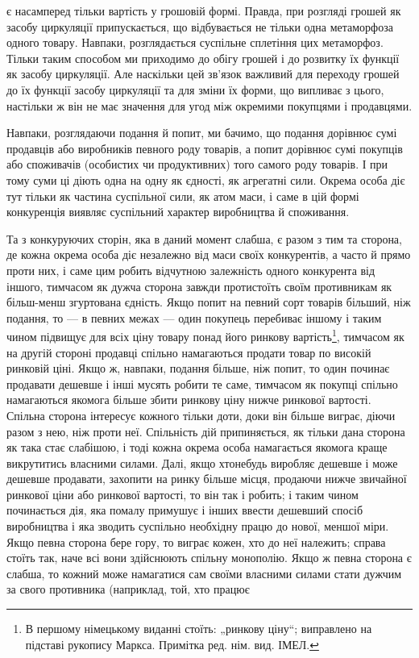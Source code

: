 є насамперед тільки вартість у грошовій формі. Правда, при
розгляді грошей як засобу циркуляції припускається, що відбувається
не тільки одна метаморфоза одного товару. Навпаки,
розглядається суспільне сплетіння цих метаморфоз. Тільки
таким способом ми приходимо до обігу грошей і до розвитку їх
функції як засобу циркуляції. Але наскільки цей зв’язок важливий
для переходу грошей до їх функції засобу циркуляції та
для зміни їх форми, що випливає з цього, настільки ж він не
має значення для угод між окремими покупцями і продавцями.

Навпаки, розглядаючи подання й попит, ми бачимо, що подання
дорівнює сумі продавців або виробників певного роду
товарів, а попит дорівнює сумі покупців або споживачів (особистих
чи продуктивних) того самого роду товарів. І при тому
суми ці діють одна на одну як єдності, як агрегатні сили. Окрема
особа діє тут тільки як частина суспільної сили, як атом маси,
і саме в цій формі конкуренція виявляє суспільний характер
виробництва й споживання.

Та з конкуруючих сторін, яка в даний момент слабша, є разом
з тим та сторона, де кожна окрема особа діє незалежно від маси
своїх конкурентів, а часто й прямо проти них, і саме цим робить
відчутною залежність одного конкурента від іншого, тимчасом
як дужча сторона завжди протистоїть своїм противникам як
більш-менш згуртована єдність. Якщо попит на певний сорт
товарів більший, ніж подання, то — в певних межах — один покупець
перебиває іншому і таким чином підвищує для всіх ціну
товару понад його ринкову вартість\footnote*{
В першому німецькому виданні стоїть: „ринкову ціну“; виправлено на
підставі рукопису Маркса. Примітка ред. нім. вид. ІМЕЛ.
}, тимчасом як на другій
стороні продавці спільно намагаються продати товар по високій
ринковій ціні. Якщо ж, навпаки, подання більше, ніж попит,
то один починає продавати дешевше і інші мусять робити те саме,
тимчасом як покупці спільно намагаються якомога більше збити
ринкову ціну нижче ринкової вартості. Спільна сторона інтересує
кожного тільки доти, доки він більше виграє, діючи разом з нею,
ніж проти неї. Спільність дій припиняється, як тільки дана сторона
як така стає слабішою, і тоді кожна окрема особа намагається
якомога краще викрутитись власними силами. Далі,
якщо хтонебудь виробляє дешевше і може дешевше продавати,
захопити на ринку більше місця, продаючи нижче звичайної
ринкової ціни або ринкової вартості, то він так і робить; і таким
чином починається дія, яка помалу примушує і інших ввести
дешевший спосіб виробництва і яка зводить суспільно необхідну
працю до нової, меншої міри. Якщо певна сторона бере гору,
то виграє кожен, хто до неї належить; справа стоїть так, наче
всі вони здійснюють спільну монополію. Якщо ж певна сторона
є слабша, то кожний може намагатися сам своїми власними силами
стати дужчим за свого противника (наприклад, той, хто працює